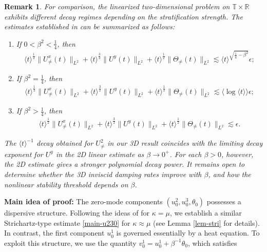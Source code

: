\documentclass[12pt]{article}
\newtheorem{remark}{Remark}[section]
\numberwithin{equation}{section}
\begin{document}
    \begin{remark}
        For comparison, the linearized two-dimensional problem on $\mathbb{T}\times\mathbb{R}$ exhibits different decay regimes depending on the stratification strength. The estimates established in \cite{YL18} can be summarized as follows:
        \begin{enumerate}
            \item If $0<\beta^2<\frac{1}{4}$, then
            \begin{align*}
             \langle t\rangle^{\frac12}\|U^{x}_{\neq}(t)\|_{L^2}+\langle t\rangle^{\frac32} \|U^y(t)\|_{L^2}+\langle t\rangle^{\frac12}\|\Theta_{\neq}(t)\|_{L^2}\lesssim \langle t\rangle^{\sqrt{\frac14-\beta^2}}\epsilon;
        \end{align*}
        \item If $\beta^2=\frac{1}{4}$, then
        \begin{align*}
            \langle t\rangle^{\frac12}\|U^{x}_{\neq}(t)\|_{L^2}+\langle t\rangle^{\frac32} \|U^y(t)\|_{L^2}+\langle t\rangle^{\frac12}\|\Theta_{\neq}(t)\|_{L^2}\lesssim \langle\log\langle t\rangle\rangle\epsilon;
        \end{align*}
        \item If $\beta^2>\frac{1}{4}$, then
        \begin{align*}
            \langle t\rangle^{\frac12}\|U^{x}_{\neq}(t)\|_{L^2}+\langle t\rangle^{\frac32} \|U^y(t)\|_{L^2}+\langle t\rangle^{\frac12}\|\Theta_{\neq}(t)\|_{L^2}\lesssim \epsilon.
        \end{align*}
        \end{enumerate}
        The \(\langle t\rangle^{-1}\) decay obtained for \(U^2_{\neq}\) in our 3D result coincides with the limiting decay exponent for $U^y$ in the 2D linear estimate as \(\beta\to0^+\). For each \(\beta>0\), however, the 2D estimate gives a stronger polynomial decay power. It remains open to determine whether the 3D inviscid damping rates improve with \(\beta\), and how the nonlinear stability threshold depends on \(\beta\).
    \end{remark}         
	\noindent\textbf{Main idea of proof:} The zero-mode components $(u^2_0,u^3_0,\theta_0)$ possesses a  dispersive structure. Following the ideas of \cite{LSWZ25} for $\kappa=\mu$, we establish a similar Strichartz-type estimate \eqref{main-u230} for $\kappa\approx\mu$ (see Lemma \ref{lem-stri} for details). In contrast, the first component $u^1_0$ is governed essentially by a heat equation. To exploit this structure, we use the quantity $v^1_0=u^1_0+\beta^{-1}\theta_0$, which satisfies  
\end{document}
